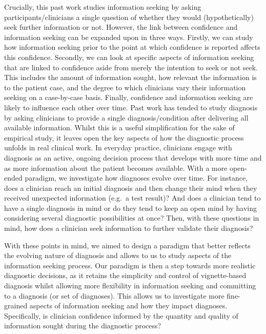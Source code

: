 \documentclass[a4paper, nobind]{templates/ociamthesis}
\begin{document}
Crucially, this past work studies information seeking by asking participants/clinicians a single question of whether they would (hypothetically) seek further information or not. However, the link between confidence and information seeking can be expanded upon in three ways. Firstly, we can study how information seeking prior to the point at which confidence is reported affects this confidence. Secondly, we can look at specific aspects of information seeking that are linked to confidence aside from merely the intention to seek or not seek. This includes the amount of information sought, how relevant the information is to the patient case, and the degree to which clinicians vary their information seeking on a case-by-case basis. Finally, confidence and information seeking are likely to influence each other over time. Past work has tended to study diagnosis by asking clinicians to provide a single diagnosis/condition after delivering all available information. Whilst this is a useful simplification for the sake of empirical study, it leaves open the key aspects of how the diagnostic process unfolds in real clinical work. In everyday practice, clinicians engage with diagnosis as an active, ongoing decision process that develops with more time and as more information about the patient becomes available. With a more open-ended paradigm, we investigate how diagnoses evolve over time. For instance, does a clinician reach an initial diagnosis and then change their mind when they received unexpected information (e.g.~a test result)? And does a clinician tend to have a single diagnosis in mind or do they tend to keep an open mind by having considering several diagnostic possibilities at once? Then, with these questions in mind, how does a clinician seek information to further validate their diagnosis?

\hfill\break
With these points in mind, we aimed to design a paradigm that better reflects the evolving nature of diagnosis and allows to us to study aspects of the information seeking process. Our paradigm is then a step towards more realistic diagnostic decisions, as it retains the simplicity and control of vignette-based diagnosis whilst allowing more flexibility in information seeking and committing to a diagnosis (or set of diagnoses). This allows us to investigate more fine-grained aspects of information seeking and how they impact diagnoses. Specifically, is clinician confidence informed by the quantity and quality of information sought during the diagnostic process?
\end{document}
